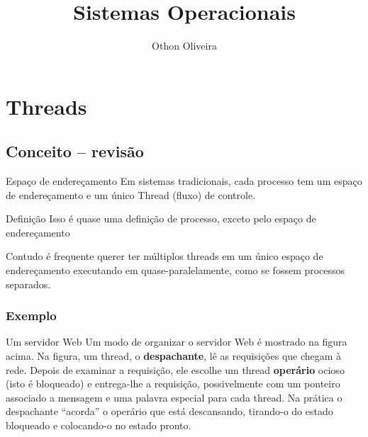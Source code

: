 \documentclass[11pt]{beamer}
\author{Othon Oliveira}
\title{Sistemas Operacionais}
\institute{Fatec -- Faculdade de Informática --- PE}
\begin{document}
\newcommand{\capa}{
    \begin{tikzpicture}[remember picture,overlay]
        \node at (current page.south west)
            {\begin{tikzpicture}[remember picture, overlay]
                \fill[shading=radial,top color=orange,bottom color=orange,middle color=yellow] (0,0) rectangle (\paperwidth,\paperheight);
            \end{tikzpicture}
          };
    \end{tikzpicture}
}




\begin{frame}
\titlepage
\end{frame}

\begin{frame}
\tableofcontents
\end{frame}



\section{Threads}
\subsection*{Conceito -- revisão}

\begin{frame}{Espaço de endereçamento}
 Em sistemas tradicionais, cada processo tem um espaço de endereçamento e um único Thread (fluxo) de controle.
 
\pause
 \begin{block}{Definição}
 	Isso é quase uma definição de processo, exceto pelo espaço de endereçamento
 \end{block}
 
 \pause
 Contudo é frequente querer ter múltiplos threads em um único espaço de endereçamento executando em quase-paralelamente, como se fossem processos separados.
\end{frame}


\begin{frame}\frametitle{ Exemplo}

\begin{block}{ Um servidor Web}
Um modo de organizar o servidor Web é mostrado na figura acima.
Na figura, um thread, o \textbf{despachante}, lê as requisições que chegam à rede. 
Depois de examinar a requisição, ele escolhe um thread \textbf{operário} ocioso (isto é bloqueado) e entrega-lhe a requisição, 
possivelmente com um ponteiro associado a mensagem e uma palavra especial para cada thread. 
Na prática o despachante ``acorda'' o operário que está descansando, tirando-o do estado bloqueado e colocando-o no estado pronto.
\end{block}

\end{frame}
\end{document}
